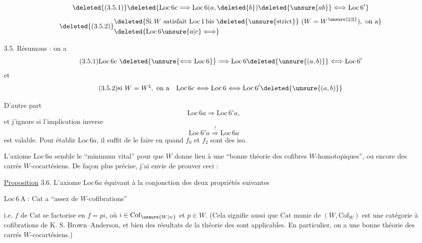 \[\tag*{\deleted{(3.5.1)}}\deleted{\mathrm{Loc}\,6c\Longrightarrow\mathrm{Loc}\,6(a,\deleted{b})\deleted{\unsure{ab}}\Longleftrightarrow\mathrm{Loc}\,6'}\]
\[\tag*{\deleted{(3.5.2)}}\begin{aligned}&\deleted{\text{Si } W\text{ satisfait } \mathrm{Loc}\,1\,\mathrm{bis}\ \deleted{\unsure{\text{strict}}}\ (W=W^{\unsure{\natural|\sharp}}),\ \text{on a}}\\&\deleted{\mathrm{Loc}\,6\unsure{a|c}\Longleftrightarrow}\end{aligned}\]

3.5. Résumons : on a
\[\tag*{(3.5.1)}\mathrm{Loc}\,6c\ \deleted{\unsure{\Longleftrightarrow\mathrm{Loc}\,6}}\Longrightarrow\mathrm{Loc}\,6\deleted{\unsure{(a,b)}}\Longleftrightarrow\mathrm{Loc}\,6'\]
et
\[\tag*{(3.5.2)}\text{si }W=W^{\natural},\ \text{on a}\quad\mathrm{Loc}\,6c\Longleftrightarrow\mathrm{Loc}\,6\Longleftrightarrow\mathrm{Loc}\,6'\deleted{\unsure{(a,b)}}\]


D'autre part
\[\tag*{(3.5.3)}\mathrm{Loc}\,6a\Longrightarrow\mathrm{Loc}\,6'a,\]
et j'ignore si  l'implication inverse
\[\mathrm{Loc}\,6'a\overset{?}{\Longrightarrow}\mathrm{Loc}\,6a\]
est valable. Pour établir $\mathrm{Loc}\,6a$, il suffit de le faire en  quand $f_0$ et $f_2$ sont des iso.

L'axiome $\mathrm{Loc}\,6a$ semble le ``minimum vital'' pour que $W$ donne lieu à une ``bonne théorie des cofibres $W$-homotopiques'', ou encore des carrés $W$-cocartésiens. De façon plus précise, j'ai envie de prouver ceci :

\uline{Proposition} 3.6. L'axiome $\mathrm{Loc}\,6a$ équivaut à la conjonction des deux propriétés suivantes

$\mathrm{Loc}\,6\,\mathrm{A}$ :  $\mathrm{Cat}$ a ``assez de $W$-cofibrations''

i.e.   $f$ de $\mathrm{Cat}$ se factorise en $f=pi$, où $i\in\mathrm{Cof}_{\unsure{W|w}}$ et $p\in W$. (Cela signifie aussi que $\mathrm{Cat}$ munie de $(W,\mathrm{Cof}_W)$ est une catégorie à cofibrations de K. S. Brown--Anderson, et bien des résultats de la théorie des  sont applicables. En particulier, on a une bonne théorie des carrés $W$-cocartésiens.)


